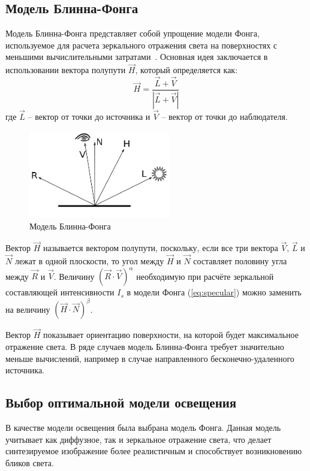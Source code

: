 \subsection{Модель Блинна-Фонга}
Модель Блинна-Фонга представляет собой упрощение модели Фонга, используемое для расчета зеркального отражения света на поверхностях с меньшими вычислительными затратами~\cite{lit3, lit7}. Основная идея заключается в использовании вектора полупути $\vec{H}$, который определяется как:
\begin{equation}
	\vec{H} = \frac{\vec{L} + \vec{V}}{|\vec{L} + \vec{V}|}
\end{equation}
где  $\vec{L}$ -- вектор от точки до источника и $\vec{V}$ -- вектор от точки до наблюдателя. 

\begin{figure}[h] 
	\centering
	\includegraphics[width=0.55\textwidth]{images/blinn-phong.png}
	\caption{Модель Блинна-Фонга} 
	\label{fig:blinn-phong} 
\end{figure}

Вектор $\vec{H}$ называется вектором полупути, поскольку, если все три вектора $\vec{V}$, $\vec{L}$ и $\vec{N}$ лежат в одной плоскости, то угол между $\vec{H}$ и $\vec{N}$ составляет половину угла между $\vec{R}$ и $\vec{V}$. Величину $(\vec{R} \cdot \vec{V})^{\alpha}$ необходимую при расчёте зеркальной составляющей интенсивности $I_s$ в модели Фонга (\ref{eq:specular}) можно заменить на величину $(\vec{H} \cdot \vec{N})^{\beta}$.

Вектор $\vec{H}$ показывает ориентацию поверхности, на которой будет максимальное отражение света. В ряде случаев модель Блинна-Фонга требует значительно меньше вычислений, например в случае направленного бесконечно-удаленного источника.

\subsection{Выбор оптимальной модели освещения}

В качестве модели освещения была выбрана модель Фонга. Данная модель учитывает как диффузное, так и зеркальное отражение света, что делает синтезируемое изображение более реалистичным и способствует возникновению бликов света.

